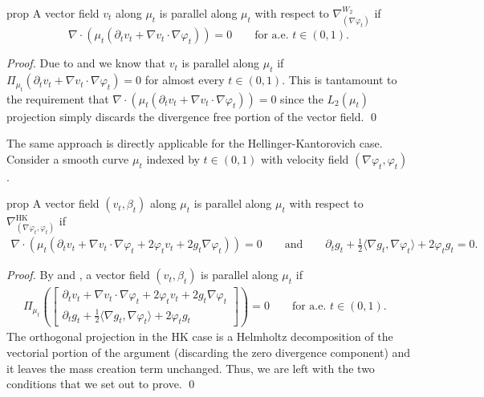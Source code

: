 \documentclass{article}
\begin{document}
\begin{restatable}{prop}{} \label{Wasserstein parallel transport pde}
    A vector field $v_t$ along $\mu_t$ is parallel along $\mu_t$ with respect to $\nabla_{(\nabla\varphi_t)}^{W_2}$ if
    \begin{equation*}
        \boxed{\nabla \cdot \left(\mu_t\left(\partial_t v_t + \nabla v_t \cdot \nabla \varphi_t\right)\right) = 0 \qquad \text{for a.e. $t \in (0,1).$}}
    \end{equation*}
\end{restatable}
\noindent \textit{Proof.} Due to  and  we know that $v_t$ is parallel along $\mu_t$ if $\Pi_{\mu_t}\left(\partial_tv_t + \nabla v_t \cdot \nabla\varphi_t\right) = 0$ for almost every $t \in (0,1).$ This is tantamount to the requirement that $\nabla \cdot \left(\mu_t(\partial_tv_t + \nabla v_t \cdot \nabla\varphi_t)\right) = 0$ since the $L_2(\mu_t)$ projection simply discards the divergence free portion of the vector field. \qed{}

The same approach is directly applicable for the Hellinger-Kantorovich case. Consider a smooth curve $\mu_t$ indexed by $t \in (0,1)$ with velocity field $(\nabla\varphi_t, \varphi_t)$. 

\begin{restatable}{prop}{} \label{HK parallel transport pde}
    A vector field $(v_t, \beta_t)$ along $\mu_t$ is parallel along $\mu_t$ with respect to $\nabla_{(\nabla\varphi_t, \varphi_t)}^{\text{HK}}$ if
    \begin{align*}
        \boxed{\nabla \cdot (\mu_t (\partial_tv_t + \nabla v_t \cdot \nabla \varphi_t + 2\varphi_t v_t + 2g_t \nabla\varphi_t)) = 0 
        \qquad \text{and} \qquad 
        \partial_tg_t + \frac{1}{2}\langle\nabla g_t, \nabla\varphi_t\rangle + 2\varphi_t g_t = 0.}
    \end{align*}
\end{restatable}
\noindent \textit{Proof.} By  and , a vector field $(v_t, \beta_t)$ is parallel along $\mu_t$ if
\begin{align}
    \Pi_{\mu_t}\left(\begin{bmatrix}
        \partial_tv_t + \nabla v_t\cdot \nabla\varphi_t + 2\varphi_tv_t +  2g_t\nabla\varphi_t \\
        \partial_tg_t + \frac{1}{2}\langle\nabla g_t, \nabla\varphi_t\rangle + 2\varphi_t g_t
    \end{bmatrix}\right) = 0 \qquad \text{for a.e. $t \in (0,1).$ }
\end{align}
The orthogonal projection in the HK case is a Helmholtz decomposition of the vectorial portion of the argument (discarding the zero divergence component) and it leaves the mass creation term unchanged. Thus, we are left with the two conditions that we set out to prove. \qed{}
\\
\end{document}

